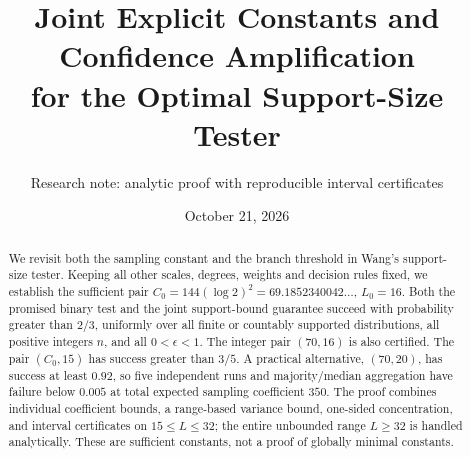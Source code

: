 \documentclass[10pt]{article}
\title{Joint Explicit Constants and Confidence Amplification\\for the Optimal Support-Size Tester}
\author{Research note: analytic proof with reproducible interval certificates}
\date{October 21, 2026}
\begin{document}
\maketitle
\begin{abstract}
We revisit both the sampling constant and the branch threshold in Wang's
support-size tester. Keeping all other scales, degrees, weights and decision
rules fixed, we establish the sufficient pair
$C_0=144(\log 2)^2=69.1852340042\ldots$, $L_0=16$.
Both the promised binary test and the joint support-bound guarantee succeed
with probability greater than $2/3$, uniformly over all finite or countably
supported distributions, all positive integers $n$, and all $0<\epsilon<1$.
The integer pair $(70,16)$ is also certified. The pair $(C_0,15)$ has success
greater than $3/5$. A practical alternative, $(70,20)$, has success at least
$0.92$, so five independent runs and majority/median aggregation have failure
below $0.005$ at total expected sampling coefficient $350$.
The proof combines individual coefficient bounds, a range-based variance
bound, one-sided concentration, and interval certificates on $15\le L\le32$;
the entire unbounded range $L\ge32$ is handled analytically. These are
sufficient constants, not a proof of globally minimal constants.
\end{abstract}
\end{document}

